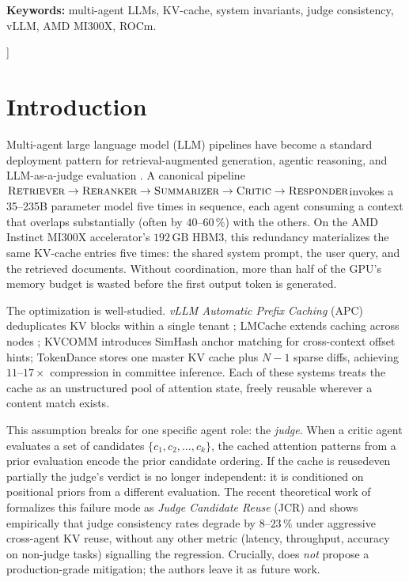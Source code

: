 \documentclass[10pt,twocolumn]{article}
\begin{document}
\begin{onecolabstract}
    \vspace{0.5em}
    \noindent\textbf{Keywords:} multi-agent LLMs, KV-cache, system
    invariants, judge consistency, vLLM, AMD MI300X, ROCm.
    \vspace{1em}
  \end{onecolabstract}
]

\section{Introduction}
\label{sec:intro}

Multi-agent large language model (LLM) pipelines have become a standard
deployment pattern for retrieval-augmented generation, agentic reasoning, and
LLM-as-a-judge evaluation
\cite{kvcomm,tokendance,specdecode}. A
canonical pipeline\textemdash $\textsc{Retriever} \rightarrow
\textsc{Reranker} \rightarrow \textsc{Summarizer} \rightarrow \textsc{Critic}
\rightarrow \textsc{Responder}$\textemdash invokes a 35--235B parameter model
five times in sequence, each agent consuming a context that overlaps
substantially (often by $40$--$60\,\%$) with the others. On the AMD Instinct
MI300X accelerator's $192\,\mathrm{GB}$ HBM3, this redundancy materializes
the same KV-cache entries five times: the shared system prompt, the user
query, and the retrieved documents. Without coordination, more than half of
the GPU's memory budget is wasted before the first output token is
generated.

The optimization is well-studied. \emph{vLLM Automatic Prefix Caching} (APC)
deduplicates KV blocks within a single tenant
\cite{vllm}; LMCache extends caching across nodes \cite{lmcache};
KVCOMM \cite{kvcomm} introduces SimHash anchor matching for cross-context
offset hints; TokenDance \cite{tokendance} stores one master KV cache plus
$N-1$ sparse diffs, achieving $11$--$17\times$ compression in committee
inference. Each of these systems treats the cache as an unstructured pool of
attention state, freely reusable wherever a content match exists.

This assumption breaks for one specific agent role: the \emph{judge}. When
a critic agent evaluates a set of candidates $\{c_1, c_2, \ldots, c_k\}$,
the cached attention patterns from a prior evaluation encode the prior
candidate ordering. If the cache is reused\textemdash even partially\textemdash
the judge's verdict is no longer independent: it is conditioned on
positional priors from a different evaluation. The recent theoretical work
of \cite{jcrfailure} formalizes this failure mode as \emph{Judge Candidate
Reuse} (JCR) and shows empirically that judge consistency rates degrade by
$8$--$23\,\%$ under aggressive cross-agent KV reuse, without any other
metric (latency, throughput, accuracy on non-judge tasks) signalling the
regression. Crucially, \cite{jcrfailure} does \emph{not} propose a
production-grade mitigation; the authors leave it as future work.
\end{document}
